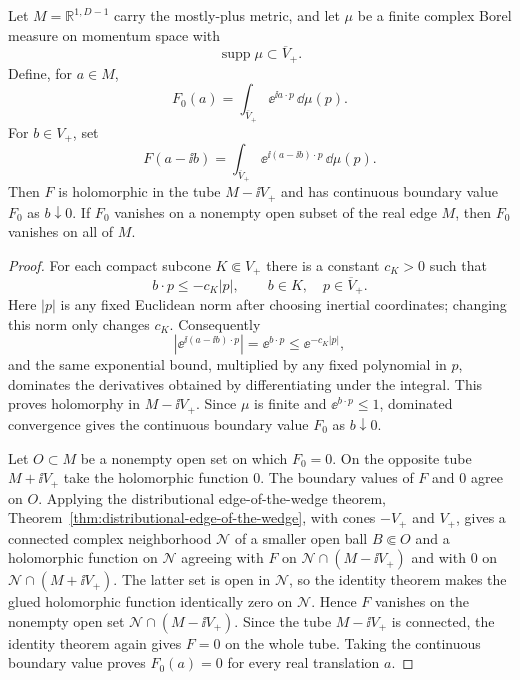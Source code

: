 \begin{lemma}
\label{lem:positive-energy-tube-uniqueness}
Let \(M=\mathbb R^{1,D-1}\) carry the mostly-plus metric, and let
\(\mu\) be a finite complex Borel measure on momentum space with
\[
  \operatorname{supp}\mu\subset\overline V_+ .
\]
Define, for \(a\in M\),
\[
  F_0(a)=\int_{\overline V_+}\ee^{\ii a\cdot p}\,\dd\mu(p).
\]
For \(b\in V_+\), set
\[
  F(a-\ii b)
  =
  \int_{\overline V_+}\ee^{\ii(a-\ii b)\cdot p}\,\dd\mu(p).
\]
Then \(F\) is holomorphic in the tube \(M-\ii V_+\) and has continuous
boundary value \(F_0\) as \(b\downarrow0\).  If \(F_0\) vanishes on a
nonempty open subset of the real edge \(M\), then \(F_0\) vanishes on all of
\(M\).
\end{lemma}

\begin{proof}
For each compact subcone \(K\Subset V_+\) there is a constant \(c_K>0\) such
that
\[
  b\cdot p\le -c_K |p|,
  \qquad b\in K,\quad p\in\overline V_+ .
\]
Here \(|p|\) is any fixed Euclidean norm after choosing inertial coordinates;
changing this norm only changes \(c_K\).
Consequently
\[
  \left|\ee^{\ii(a-\ii b)\cdot p}\right|
  =
  \ee^{b\cdot p}
  \le
  \ee^{-c_K|p|},
\]
and the same exponential bound, multiplied by any fixed polynomial in \(p\),
dominates the derivatives obtained by differentiating under the integral.
This proves holomorphy in \(M-\ii V_+\).  Since \(\mu\) is finite and
\(\ee^{b\cdot p}\le1\), dominated convergence gives the continuous boundary
value \(F_0\) as \(b\downarrow0\).

Let \(O\subset M\) be a nonempty open set on which \(F_0=0\).  On the
opposite tube \(M+\ii V_+\) take the holomorphic function \(0\).  The boundary
values of \(F\) and \(0\) agree on \(O\).  Applying the distributional
edge-of-the-wedge theorem,
Theorem~\ref{thm:distributional-edge-of-the-wedge}, with cones
\(-V_+\) and \(V_+\), gives a connected complex neighborhood \(\mathcal N\)
of a smaller open ball \(B\Subset O\) and a holomorphic function on
\(\mathcal N\) agreeing with \(F\) on
\(\mathcal N\cap(M-\ii V_+)\) and with \(0\) on
\(\mathcal N\cap(M+\ii V_+)\).  The latter set is open in \(\mathcal N\), so
the identity theorem makes the glued holomorphic function identically zero on
\(\mathcal N\).  Hence \(F\) vanishes on the nonempty open set
\(\mathcal N\cap(M-\ii V_+)\).  Since the tube \(M-\ii V_+\) is connected,
the identity theorem again gives \(F=0\) on the whole tube.  Taking the
continuous boundary value proves \(F_0(a)=0\) for every real translation
\(a\).
\end{proof}

